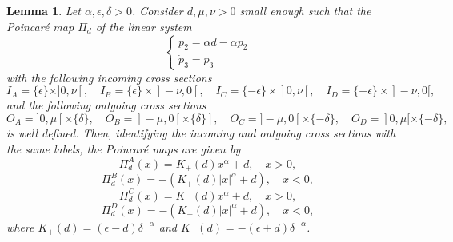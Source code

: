 \documentclass{article}
\newtheorem{lem}{Lemma}
\theoremstyle{definition}
\begin{document}
\begin{lem}\label{lem:poincaremap}
Let $\alpha,\epsilon,\delta >0$. Consider $d,\mu,\nu>0$ small enough such that the Poincaré map $\Pi_d$ of the linear system 
$$
\begin{cases}
\dot{p}_2=\alpha d- \alpha p_2\\
\dot{p}_3=p_3
\end{cases}
$$
with the following incoming cross sections 
$$I_A=\{\epsilon\}\times ]0,\nu[,\quad I_B=\{\epsilon\}\times ]-\nu,0[,\quad
I_C=\{-\epsilon\}\times ]0,\nu[,\quad I_D=\{-\epsilon\}\times ]-\nu,0[,$$
and the following outgoing cross sections 
$$O_A=]0,\mu[\times \{\delta\},\quad O_B=]-\mu,0[ \times \{\delta\}],\quad O_C=]-\mu,0[\times \{-\delta\},\quad O_D=]0,\mu[ \times \{-\delta\},$$
is well defined.
Then, identifying the incoming and outgoing cross sections with the same labels, the Poincaré maps are given by
$$\Pi^{A}_{d}(x) = K_+(d)x^{\alpha}+d,\quad x>0,$$
$$\Pi^{B}_{d}(x) = -(K_+(d)|x|^{\alpha}+d),\quad x<0,$$
$$\Pi^{C}_{d}(x) = K_-(d)x^{\alpha}+d,\quad x>0,$$
$$\Pi^{D}_{d}(x) = -(K_-(d)|x|^{\alpha}+d),\quad x<0,$$
where $K_+(d) = ( \epsilon -d )\delta^{-\alpha}$ and $K_-(d) = -( \epsilon + d )\delta^{-\alpha}$.
\end{lem}
\end{document}
